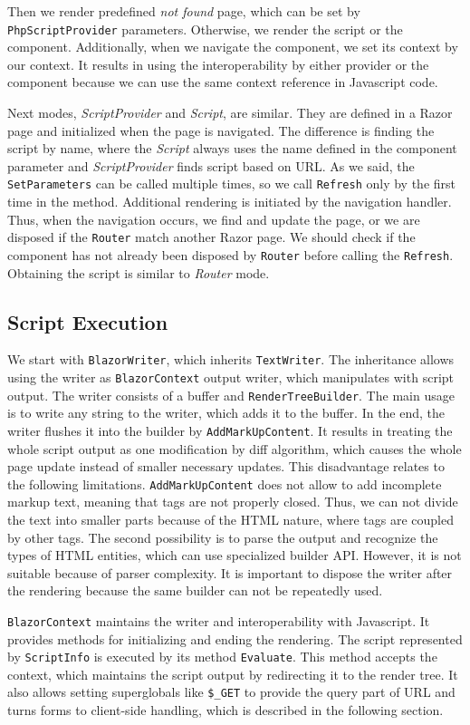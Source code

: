 Then we render predefined \textit{not found} page, which can be set by \texttt{PhpScriptProvider} parameters.
Otherwise, we render the script or the component.
Additionally, when we navigate the component, we set its context by our context.
It results in using the interoperability by either provider or the component because we can use the same context reference in Javascript code.
\par
Next modes, \textit{ScriptProvider} and \textit{Script}, are similar.
They are defined in a Razor page and initialized when the page is navigated.  
The difference is finding the script by name, where the \textit{Script} always uses the name defined in the component parameter and \textit{ScriptProvider} finds script based on URL.
As we said, the \texttt{SetParameters} can be called multiple times, so we call \texttt{Refresh} only by the first time in the method.
Additional rendering is initiated by the navigation handler.
Thus, when the navigation occurs, we find and update the page, or we are disposed if the \texttt{Router} match another Razor page. 
We should check if the component has not already been disposed by \texttt{Router} before calling the \texttt{Refresh}.
Obtaining the script is similar to \textit{Router} mode.

\subsection{Script Execution}
We start with \texttt{BlazorWriter}, which inherits \texttt{TextWriter}.
The inheritance allows using the writer as \texttt{BlazorContext} output writer, which manipulates with script output.
The writer consists of a buffer and \texttt{RenderTreeBuilder}.
The main usage is to write any string to the writer, which adds it to the buffer.
In the end, the writer flushes it into the builder by \texttt{AddMarkUpContent}.
It results in treating the whole script output as one modification by diff algorithm, which causes the whole page update instead of smaller necessary updates.
This disadvantage relates to the following limitations.
\texttt{AddMarkUpContent} does not allow to add incomplete markup text, meaning that tags are not properly closed.
Thus, we can not divide the text into smaller parts because of the HTML nature, where tags are coupled by other tags.
The second possibility is to parse the output and recognize the types of HTML entities, which can use specialized builder API.
However, it is not suitable because of parser complexity.
It is important to dispose the writer after the rendering because the same builder can not be repeatedly used.
\par
\texttt{BlazorContext} maintains the writer and interoperability with Javascript.
It provides methods for initializing and ending the rendering.
The script represented by \texttt{ScriptInfo} is executed by its method \texttt{Evaluate}. This method accepts the context, which maintains the script output by redirecting it to the render tree.
It also allows setting superglobals like \texttt{\$\_GET} to provide the query part of URL and turns forms to client-side 
handling, which is described in the following section.


